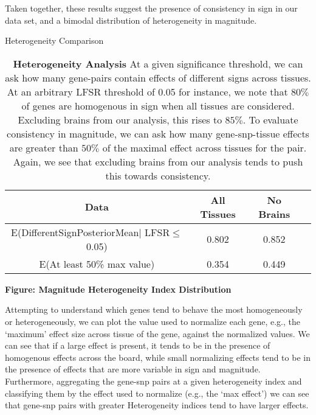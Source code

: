 Taken together, these results suggest the presence of consistency in sign in our data set, and a bimodal distribution of heterogeneity in magnitude.

\begin{table}[htbp]
\caption{Heterogeneity Comparison}
\centering
\begin{tabular}{c c c c}
\hline\hline
Data & All Tissues  & No Brains  \\ [0.5ex] %
\hline
E(DifferentSignPosteriorMean$\mid$ LFSR$\leq$0.05)&0.802&0.852\\
E(At least 50\% max value) &0.354&0.449\\
\hline
\end{tabular}
\label{table:nonlin}
\caption{\textbf{Heterogeneity Analysis} At a given significance threshold, we can ask how many gene-pairs contain effects of different signs across tissues. At an arbitrary LFSR threshold of 0.05 for instance, we note that $80\%$ of genes are homogenous in sign when all tissues are considered. Excluding brains from our analysis, this rises to $85\%$. To evaluate consistency in magnitude, we can ask how many gene-snp-tissue effects are greater than $50\%$ of the maximal effect across tissues for the pair. Again, we see that excluding brains from our analysis tends to push this towards consistency.}
\end{table} \newline


\textbf{Figure: Magnitude Heterogeneity Index Distribution}
\newline

Attempting to understand which genes tend to behave the most homogeneously or heterogeneously, we can plot the value used to normalize each gene, e.g., the `maximum' effect size across tissue of the gene, against the normalized values. We can see that if a large effect is present, it tends to be in the presence of homogenous effects across the board, while small normalizing effects tend to be in the presence of effects that are more variable in sign and magnitude. Furthermore, aggregating the gene-snp pairs at a given heterogeneity index and classifying them by the effect used to normalize (e.g., the `max effect') we can see that gene-snp pairs with greater Heterogeneity indices tend to have larger effects. \newline


